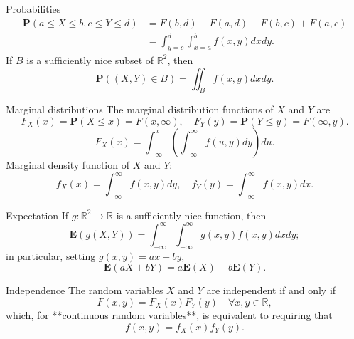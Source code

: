 \begin{newnotion}{Probabilities}
\begin{equation*}
    \begin{aligned} 
        \mathbf{P}(a \leq X \leq b, c \leq Y \leq d) &=F(b, d)-F(a, d)-F(b, c)+F(a, c) \\ 
        &=\int_{y=c}^{d} \int_{x=a}^{b} f(x, y) d x d y. \end{aligned}
\end{equation*}
If $B$ is a sufficiently nice subset of $\mathbb{R}^2$, then
\begin{equation*}
    \mathbf{P} \left( (X, Y) \in B \right)=\iint_{B} f(x, y) d x d y.
\end{equation*}
\end{newnotion}
\begin{newnotion}{Marginal distributions}
The marginal distribution functions of $X$ and $Y$ are
\begin{equation*}
    F_{X}(x)=\mathbf{P}(X \leq x)=F(x, \infty), \quad F_{Y}(y)=\mathbf{P}(Y \leq y)=F(\infty, y). 
\end{equation*}
\begin{equation*}
    F_{X}(x)=\int_{-\infty}^{x}\left(\int_{-\infty}^{\infty} f(u, y) d y\right) d u.
\end{equation*}
Marginal density function of $X$ and $Y$:
\begin{equation*}
    f_{X}(x)=\int_{-\infty}^{\infty} f(x, y) d y, \quad f_{Y}(y)=\int_{-\infty}^{\infty} f(x, y) d x.
\end{equation*}
\end{newnotion}

\begin{newnotion}{Expectation}
If $g: \mathbb{R}^2 \to \mathbb{R}$ is a sufficiently nice function, then 
\begin{equation*}
    \mathbf{E}(g(X, Y))=\int_{-\infty}^{\infty} \int_{-\infty}^{\infty} g(x, y) f(x, y) d x d y;
\end{equation*}
in particular, setting $g(x, y) = ax + by$, 
\begin{equation*}
    \mathbf{E}(aX+bY) = a\mathbf{E}(X) + b\mathbf{E}(Y).
\end{equation*}
\end{newnotion}

\begin{newnotion}{Independence}
The random variables $X$ and $Y$ are independent if and only if 
\begin{equation*}
    F(x,y) = F_X(x) F_Y(y) \quad \forall x, y \in \mathbb{R},
\end{equation*}
which, for **continuous random variables**, is equivalent to requiring that 
\begin{equation*}
    f(x,y) = f_X(x) f_Y(y).
\end{equation*}
\end{newnotion}
 
